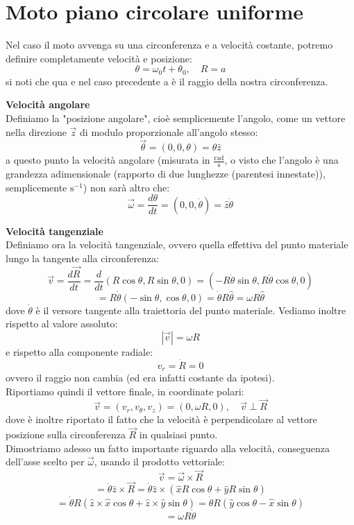 \documentclass[a4paper,12pt]{article}
\begin{document}
\section{Moto piano circolare uniforme}
Nel caso il moto avvenga su una circonferenza e a velocità costante, potremo definire completamente velocità e posizione:
$$ \theta = \omega_0t + \theta_0, \quad R = a $$
si noti che qua e nel caso precedente a è il raggio della nostra circonferenza.
\par\smallskip
\textbf{Velocità angolare} \\
Definiamo la "posizione angolare", cioè semplicemente l'angolo, come un vettore nella direzione $\vec{z}$ di modulo
proporzionale all'angolo stesso:
$$ \vec{\theta} = (0, 0, \theta) = \theta\hat{z} $$
a questo punto la velocità angolare (misurata in $\frac{\mathrm{rad}}{\mathrm{s}}$, o visto che l'angolo è una 
grandezza adimensionale (rapporto di due lunghezze (parentesi innestate)), semplicemente $\mathrm{s} ^ {-1}$) non sarà altro che:
$$ \vec{\omega} = \frac{d\theta}{dt} = (0, 0, \dot{\theta}) = \hat{z}\dot{\theta} $$
\par\smallskip
\textbf{Velocità tangenziale} \\
Definiamo ora la velocità tangenziale, ovvero quella effettiva del punto materiale lungo la tangente alla circonferenza:
$$ \vec{v} = \frac{d\vec{R}}{dt} = \frac{d}{dt}(R\cos{\theta}, R\sin{\theta}, 0)
= (-R\dot{\theta}\sin{\theta}, R\dot{\theta}\cos{\theta}, 0) $$
$$ = R\dot{\theta}(-\sin{\theta}, \cos{\theta, 0})  = \dot{\theta}R\hat{\theta} = \omega R\hat{\theta} $$
dove $\dot{\theta}$ è il versore tangente alla traiettoria del punto materiale. Vediamo inoltre rispetto al valore assoluto:
$$ |\vec{v}| = \omega R $$
e rispetto alla componente radiale:
$$ v_r = \dot{R} = 0 $$
ovvero il raggio non cambia (ed era infatti costante da ipotesi). \\
Riportiamo quindi il vettore finale, in coordinate polari:
$$ \vec{v} = (v_r, v_\theta, v_z) = (0, \omega R, 0), \quad \vec{v} \perp \vec{R} $$
dove è inoltre riportato il fatto che la velocità è perpendicolare al vettore posizione sulla circonferenza $\vec{R}$
in qualsiasi punto. \\
Dimostriamo adesso un fatto importante riguardo alla velocità, conseguenza dell'asse scelto
per $\vec{\omega}$, usando il prodotto vettoriale:
$$ \vec{v} = \vec{\omega} \times \vec{R} $$
$$ = \dot{\theta}\hat{z} \times \vec{R} = \dot{\theta}\hat{z} \times (\hat{x}R\cos{\theta} + \hat{y}R\sin{\theta}) $$
$$ = \dot{\theta}R(\hat{z} \times \hat{x}\cos{\theta} + \hat{z} \times \hat{y}\sin{\theta}) = \dot{\theta}R(\hat{y}\cos{\theta} - \hat{x}\sin{\theta}) $$
$$ = \omega R \dot{\theta} $$
\end{document}
